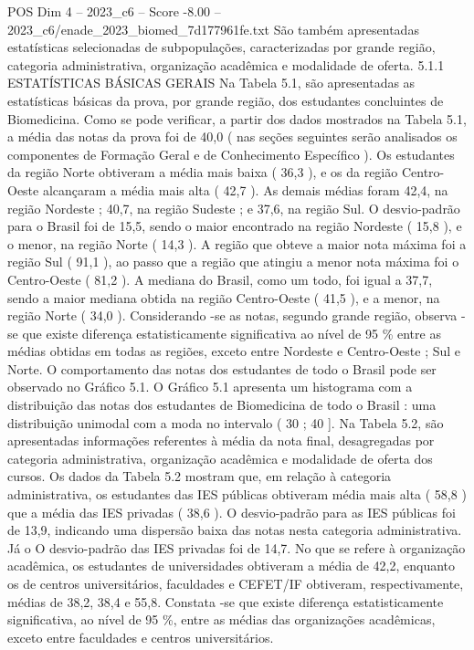 \begin{textsample}{POS Dim 4 – 2023\_c6 – Score -8.00 – 2023\_c6/enade\_2023\_biomed\_7d177961fe.txt}
São também apresentadas estatísticas selecionadas de subpopulações, caracterizadas por grande região, categoria administrativa, organização acadêmica e modalidade de oferta. 5.1.1 ESTATÍSTICAS BÁSICAS GERAIS Na Tabela 5.1, são apresentadas as estatísticas básicas da prova, por grande região, dos estudantes concluintes de Biomedicina.
Como se pode verificar, a partir dos dados mostrados na Tabela 5.1, a média das notas da prova foi de 40,0 ( nas seções seguintes serão analisados os componentes de Formação Geral e de Conhecimento Específico ).
Os estudantes da região Norte obtiveram a média mais baixa ( 36,3 ), e os da região Centro-Oeste alcançaram a média mais alta ( 42,7 ).
As demais médias foram 42,4, na região Nordeste ; 40,7, na região Sudeste ; e 37,6, na região Sul.
O desvio-padrão para o Brasil foi de 15,5, sendo o maior encontrado na região Nordeste ( 15,8 ), e o menor, na região Norte ( 14,3 ).
A região que obteve a maior nota máxima foi a região Sul ( 91,1 ), ao passo que a região que atingiu a menor nota máxima foi o Centro-Oeste ( 81,2 ).
A mediana do Brasil, como um todo, foi igual a 37,7, sendo a maior mediana obtida na região Centro-Oeste ( 41,5 ), e a menor, na região Norte ( 34,0 ).
Considerando -se as notas, segundo grande região, observa -se que existe diferença estatisticamente significativa ao nível de 95 \% entre as médias obtidas em todas as regiões, exceto entre Nordeste e Centro-Oeste ; Sul e Norte.
O comportamento das notas dos estudantes de todo o Brasil pode ser observado no Gráfico 5.1.
O Gráfico 5.1 apresenta um histograma com a distribuição das notas dos estudantes de Biomedicina de todo o Brasil : uma distribuição unimodal com a moda no intervalo ( 30 ; 40 ].
Na Tabela 5.2, são apresentadas informações referentes à média da nota final, desagregadas por categoria administrativa, organização acadêmica e modalidade de oferta dos cursos.
Os dados da Tabela 5.2 mostram que, em relação à categoria administrativa, os estudantes das IES públicas obtiveram média mais alta ( 58,8 ) que a média das IES privadas ( 38,6 ).
O desvio-padrão para as IES públicas foi de 13,9, indicando uma dispersão baixa das notas nesta categoria administrativa.
Já o O desvio-padrão das IES privadas foi de 14,7.
No que se refere à organização acadêmica, os estudantes de universidades obtiveram a média de 42,2, enquanto os de centros universitários, faculdades e CEFET/IF obtiveram, respectivamente, médias de 38,2, 38,4 e 55,8.
Constata -se que existe diferença estatisticamente significativa, ao nível de 95 \%, entre as médias das organizações acadêmicas, exceto entre faculdades e centros universitários.

\end{textsample}
